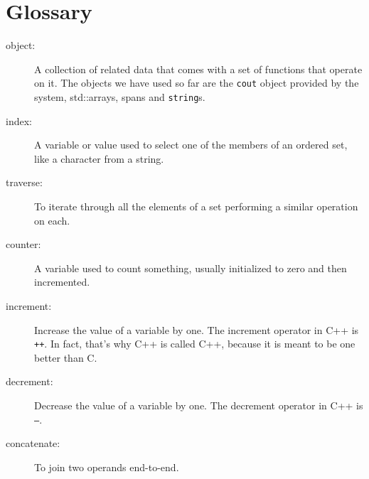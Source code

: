 \section{Glossary}

\begin{description}

\item[object:] A collection of related data that comes with a set of
functions that operate on it.  The objects we have used so far are the
{\tt cout} object provided by the system, std::arrays, spans and {\tt string}s.

\item[index:]  A variable or value used to select one of the
members of an ordered set, like a character from a string.

\item[traverse:]  To iterate through all the elements of a set
performing a similar operation on each.

\item[counter:]  A variable used to count something, usually
initialized to zero and then incremented.

\item[increment:]  Increase the value of a variable by one.
The increment operator in C++ is {\tt ++}.  In fact, that's
why C++ is called C++, because it is meant to be one better
than C.

\item[decrement:]  Decrease the value of a variable by one.
The decrement operator in C++ is {\tt --}.

\item[concatenate:] To join two operands end-to-end.


\end{description}
